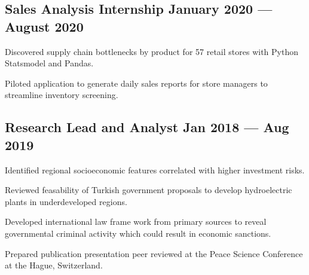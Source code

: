 \documentclass[%
               doublesided,
               paper=a4,
               fontsize=10.5pt
              ]{my-resume}
\begin{document}
{\begin{zitemize}

    \end{zitemize}

    \subsection{{Sales Analysis Internship \hfill January 2020 --- August 2020}}
    \footnotesize
    \begin{zitemize}
        \item{Discovered supply chain bottlenecks by product for 57 retail stores with Python Statsmodel and Pandas.}
        \item{Piloted application to generate daily sales reports for store managers to streamline inventory screening.} 
    \end{zitemize}

    \subsection{{Research Lead and Analyst \hfill Jan 2018 --- Aug 2019}}
    \begin{zitemize}
        \footnotesize
        \item{Identified regional socioeconomic features correlated with higher investment risks.}
        \item{Reviewed feasability of Turkish government proposals to develop hydroelectric plants in underdeveloped regions.}
        \item{Developed international law frame work from primary sources to reveal governmental criminal activity which could result in economic sanctions.}
        \item{Prepared publication presentation peer reviewed at the Peace Science Conference at the Hague, Switzerland.}
        

\end{zitemize}}
\end{document}
